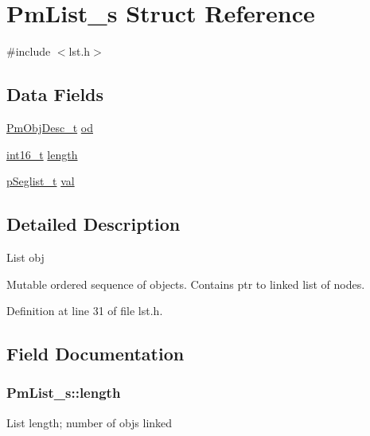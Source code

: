 \hypertarget{struct_pm_list__s}{\section{Pm\-List\-\_\-s Struct Reference}
\label{struct_pm_list__s}
}


{\ttfamily \#include $<$lst.\-h$>$}

\subsection*{Data Fields}
\begin{DoxyCompactItemize}
\item 
\hyperlink{obj_8h_a72d816790acd8eb550fb25268c2b3489}{Pm\-Obj\-Desc\-\_\-t} \hyperlink{struct_pm_list__s_a79be70a215303b32283801c5f42dab17}{od}
\item 
\hyperlink{stdint_8h_aa343fa3b3d06292b959ffdd4c4703b06}{int16\-\_\-t} \hyperlink{struct_pm_list__s_af354b8e4a7a8e6531eb70e914986a197}{length}
\item 
\hyperlink{seglist_8h_a3b2ef6a71a86b781a480a7f46cb9ab7d}{p\-Seglist\-\_\-t} \hyperlink{struct_pm_list__s_af6395fc9b1e53c0e17435259662f86c3}{val}
\end{DoxyCompactItemize}


\subsection{Detailed Description}
List obj

Mutable ordered sequence of objects. Contains ptr to linked list of nodes. 

Definition at line 31 of file lst.\-h.



\subsection{Field Documentation}
\hypertarget{struct_pm_list__s_af354b8e4a7a8e6531eb70e914986a197}{
\subsubsection[{length}]{ Pm\-List\-\_\-s\-::length}}\label{struct_pm_list__s_af354b8e4a7a8e6531eb70e914986a197}
List length; number of objs linked 


